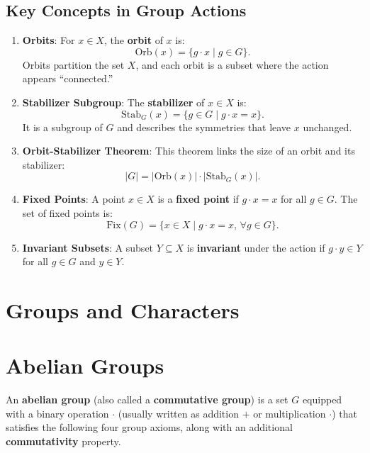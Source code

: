 \documentclass[11pt]{article}
\theoremstyle{definition}
\begin{document}
\subsection*{Key Concepts in Group Actions}

\begin{enumerate}
    \item \textbf{Orbits}:
    For \( x \in X \), the \textbf{orbit} of \( x \) is:
    \[
    \text{Orb}(x) = \{g \cdot x \mid g \in G\}.
    \]
    Orbits partition the set \( X \), and each orbit is a subset where the action appears ``connected.''

    \item \textbf{Stabilizer Subgroup}:
    The \textbf{stabilizer} of \( x \in X \) is:
    \[
    \text{Stab}_G(x) = \{g \in G \mid g \cdot x = x\}.
    \]
    It is a subgroup of \( G \) and describes the symmetries that leave \( x \) unchanged.

    \item \textbf{Orbit-Stabilizer Theorem}:
    This theorem links the size of an orbit and its stabilizer:
    \[
    |G| = |\text{Orb}(x)| \cdot |\text{Stab}_G(x)|.
    \]

    \item \textbf{Fixed Points}:
    A point \( x \in X \) is a \textbf{fixed point} if \( g \cdot x = x \) for all \( g \in G \). The set of fixed points is:
    \[
    \text{Fix}(G) = \{x \in X \mid g \cdot x = x, \, \forall g \in G\}.
    \]

    \item \textbf{Invariant Subsets}:
    A subset \( Y \subseteq X \) is \textbf{invariant} under the action if \( g \cdot y \in Y \) for all \( g \in G \) and \( y \in Y \).
\end{enumerate}




\section*{Groups and Characters}


\section{Abelian Groups}

An \textbf{abelian group} (also called a \textbf{commutative group}) is a set \( G \) equipped with a binary operation \( \cdot \) (usually written as addition \( + \) or multiplication \( \cdot \)) that satisfies the following four group axioms, along with an additional \textbf{commutativity} property.
\end{document}
